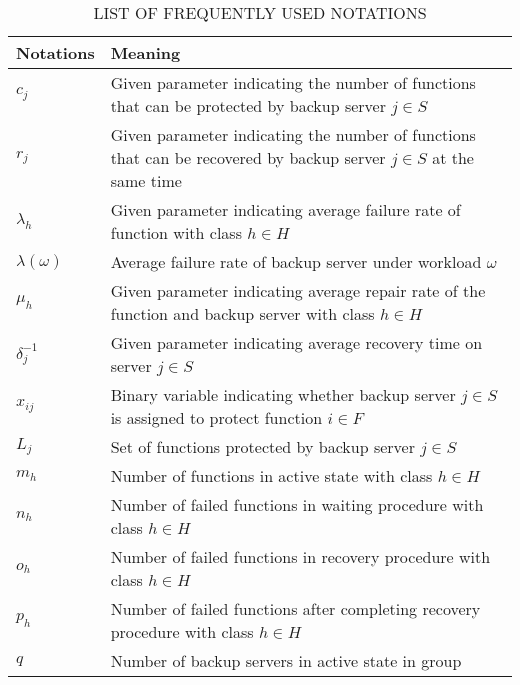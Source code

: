 \documentclass[conference]{IEEEtran}
\begin{document}
\begin{table}[h]
\caption{LIST OF FREQUENTLY USED NOTATIONS}
\begin{tabular}{lp{196pt}}
\toprule
Notations         & Meaning                 \\ \midrule
$c_j$             & Given parameter indicating the number of functions that can be protected by backup server $j \in S$                  \\
$r_j$             & Given parameter indicating the number of functions that can be recovered by backup server $j \in S$ at the same time \\ 
$\lambda_h$       & Given parameter indicating average failure rate of function with class $h \in H$                                     \\ 
$\lambda(\omega)$ & Average failure rate of backup server under workload $\omega$                                            \\
$\mu_h$      & Given parameter indicating average repair rate of the function and backup server with class $h \in H$                                       \\

$\delta_j^{-1}$   & Given parameter indicating average recovery time on server $j \in S$                                                 \\
$x_{ij}$          & Binary variable indicating whether backup server $j \in S$ is assigned to protect function $i \in F$                    \\
$L_j$             & Set of functions protected by backup server $j \in S$                                                                \\
$m_h$             & Number of functions in active state with class $h \in H$                                                             \\
$n_h$             & Number of failed functions in waiting procedure with class $h \in H$                                                 \\
$o_h$             & Number of failed functions in recovery procedure with class $h \in H$                                                \\
$p_h$             & Number of failed functions after completing recovery procedure with class $h \in H$                                  \\
$q$               & Number of backup servers in active state in group     \\                                                   \bottomrule       
\end{tabular}
\end{table}
\end{document}

